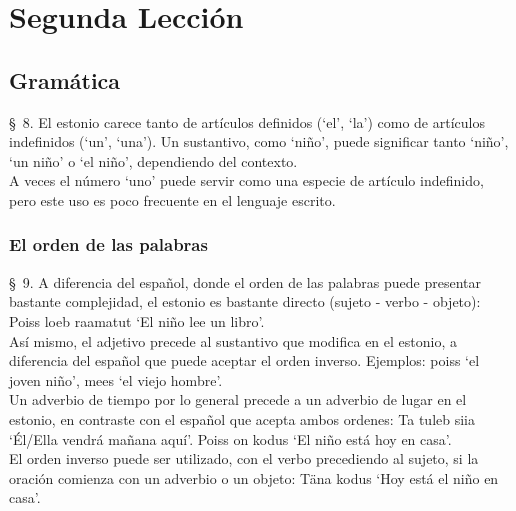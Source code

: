 %
%

\chapter{Segunda Lección} 

\label{ch:lesson02} 


\Large{\section*{Gramática}}

\S\ 8. El estonio carece tanto de artículos definidos (`el', `la') como de artículos indefinidos (`un', `una'). Un sustantivo, como  `niño', puede significar tanto `niño', `un niño' o `el niño', dependiendo del contexto.\\

A veces el número  `uno' puede servir como una especie de artículo indefinido, pero este uso es poco frecuente en el lenguaje escrito.\\

\Large{\subsection*{El orden de las palabras}}

\S\ 9. A diferencia del español, donde el orden de las palabras puede presentar bastante complejidad, el estonio es bastante directo (sujeto - verbo - objeto): Poiss loeb raamatut `El niño lee un libro'.\\

Así mismo, el adjetivo precede al sustantivo que modifica en el estonio, a diferencia del español que puede aceptar el orden inverso. Ejemplos:  poiss `el joven niño',  mees `el viejo hombre'.\\

Un adverbio de tiempo por lo general precede a un adverbio de lugar en el estonio, en contraste con el español que acepta ambos ordenes: Ta tuleb  siia `Él/Ella vendrá mañana aquí'. Poiss on  kodus `El niño está hoy en casa'.\\

El orden inverso puede ser utilizado, con el verbo precediendo al sujeto, si la oración comienza con un adverbio o un objeto: Täna  kodus `Hoy está el niño en casa'.\\

